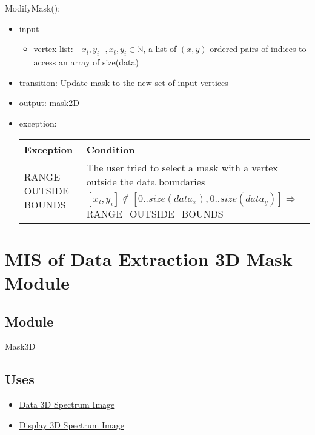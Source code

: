 \documentclass[12pt, titlepage]{article}
\begin{document}
\noindent ModifyMask():
\begin{itemize}
    \item input
    \begin{itemize}
        \item vertex list: $[x_i, y_i], x_i, y_i \in \mathbb{N}$, a list of
        $(x,y)$ ordered pairs of indices to access an array of size(data)
    \end{itemize}
    \item transition: Update mask to the new set of input vertices
    \item output: mask2D
    \item exception:
    \begin{center}
        \begin{tabular}{p{3.5cm} p{12cm}}
            \toprule[0.15em]
            \textbf{Exception} & \textbf{Condition}\\
            \midrule[0.1em]
            \multirow{2}{0.25\textwidth}{RANGE OUTSIDE BOUNDS} & The user tried
            to select a mask with a vertex outside the data boundaries\\ 
            & $[x_i, y_i] \notin [0..size(data_x), 0..size(data_y)] \Rightarrow$
            RANGE\_OUTSIDE\_BOUNDS\\ 
            \bottomrule[0.15em]
        \end{tabular}
    \end{center}
\end{itemize}

\section{MIS of Data Extraction 3D Mask Module} \label{Mod:Mask3D}

\subsection{Module}

Mask3D

\subsection{Uses}
\begin{itemize}
    \item \hyperref[Mod:SI]{Data 3D Spectrum Image}
    \item \hyperref[Mod:Disp3D]{Display 3D Spectrum Image}
\end{itemize}
\end{document}
